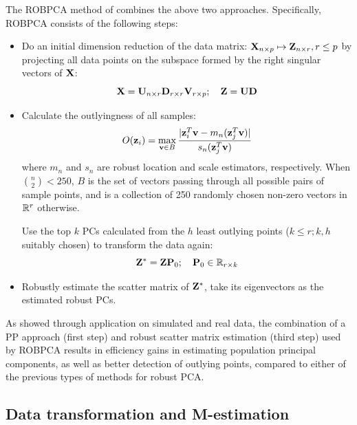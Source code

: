 The ROBPCA method of \cite{hubert05} combines the above two approaches. Specifically, ROBPCA consists of the following steps:
%
\begin{itemize}
\item Do an initial dimension reduction of the data matrix: ${\mathbf{X}}_{n \times p} \mapsto {\mathbf{Z}}_{n \times r}, r \leq p$ by projecting all data points on the subspace formed by the right singular vectors of ${\mathbf{X}}$:
%
$$
{\mathbf{X}} = {\mathbf{U}}_{n \times r} {\mathbf{D}}_{r \times r} {\mathbf{V}}_{r \times p}; \quad
{\mathbf{Z}} = {\mathbf{U}} {\mathbf{D}}
$$

\item Calculate the outlyingness of all samples:
%
$$
O({\bf{z}}_i) = \max_{{\bf{v}} \in B} \frac{| {\bf{z}}_i^T {\bf{v}} - m_n ({\bf{z}}_j^T {\bf{v}})|}{s_n ({\bf{z}}_j^T {\bf{v}} )}
$$
%
where $m_n$ and $s_n$ are robust location and scale estimators, respectively. When $\binom{n}{2} < 250$, $B$ is the set of vectors passing through all possible pairs of sample points, and is a collection of 250 randomly chosen non-zero vectors in ${\mathbb{R}}^{r}$ otherwise.

Use the top $k$ PCs calculated from the $h$ least outlying points ($k \leq r; k, h$ suitably chosen) to transform the data again:
%
$$
{\mathbf{Z}}^* =  {\mathbf{Z}} {\mathbf{P}}_0; \quad {\mathbf{P}}_0 \in {\mathbb{R}}_{r \times k}
$$


\item Robustly estimate the scatter matrix of ${\mathbf{Z}}^*$, take its eigenvectors as the estimated robust PCs.
\end{itemize}

As \cite{hubert05} showed through application on simulated and real data, the combination of a PP approach (first step) and robust scatter matrix estimation (third step) used by ROBPCA results in efficiency gains in estimating population principal components, as well as better detection of outlying points, compared to either of the previous types of methods for robust PCA.

\subsection*{\sffamily \large Data transformation and M-estimation}

